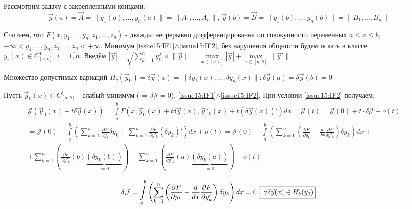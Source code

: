     Рассмотрим задачу с закрепленными концами: 
    \begin{equation} \label{issue15:IF2}
        \vec{y}(a) = \vec{A} = \| y_1(a), ..., y_n(a)\| = \| A_1, ..., A_n\|,\, \vec{y}(b) = \vec{B} = \| y_1(b), ..., y_n(b)\| = \| B_1, ..., B_n \|
    \end{equation}
    
    Считаем, что $F(x, y_1, ..., y_n, z_1, ..., z_n)$ - дважды непрерывно дифференцированна по совокупности переменных $a \leq x \leq b$, $-\infty < y_1, ..., y_n, z_1, ..., z_n < +\infty$. 
    Минимум \eqref{issue15:IF1}$\wedge$\eqref{issue15:IF2}, без нарушения общности будем искать в классе $y_i(x) \in C^1_{[a;b]}, \, i = \overline{1, n}$. 
    Введём $|\vec{y}| = \sqrt{\sum \limits_{k=1}^{n} y^2_k}$ и $\|\vec{y}\| = \max \limits_{x \in [a;b]} |\vec{y}| + \max \limits_{x \in [a;b]} \| \vec{y}' \|$ 

    Множество допустимых вариаций $H_{\delta}(\vec{y}_0) = {\delta \vec{y}(x) = \| \delta y_1 (x), ..., \delta y_n(x)\|: \delta \vec{y}(a) = \delta \vec{y}(b) = 0}$

    Пусть $\vec{y}_0(x) \in C^1_{[a;b]}$ - слабый минимум ($\Rightarrow \delta \mathcal{J} = 0$), \eqref{issue15:IF1}$\wedge$\eqref{issue15:IF2}. При условии \eqref{issue15:IF2} получаем:
    \begin{multline*}
            \mathcal{J}(\vec{y}_0(x) + t \delta \vec{y}(x)) = \int \limits_a^b F(x, \vec{y}_0(x) + t\delta \vec{y}(x), \vec{y}\,'_0(x) + t(\delta \vec{y}(x))')dx = \mathcal{J}(t) = \mathcal{J}(0) + t \cdot \delta\mathcal{J} + o(t) = \\
            = \mathcal{J}(0) + \int \limits_a^b \left( \sum \limits_{k =1}^n \frac{\partial F}{\partial y_k} \delta y_k + \sum \limits_{k=1}^n \frac{\partial F}{\partial y'_k} (\delta y_k)' \right) dx + o(t) = \mathcal{J}(0) + \int \limits_a^b \left( \sum \limits_{k = 1}^n \left( \frac{\partial F}{\partial y_k} - \frac{d}{dx} \frac{\partial F}{\delta y'_k}  \right) \delta y_k \right) dx + \\
            + \sum \limits_{k = 1}^n \left( \frac{\partial F}{\partial y'_k}(b) \underbrace{(\delta y_k (b))}_{= 0} \right) - \sum \limits_{k = 1}^n \left( \frac{\partial F}{\partial y'_k}(a) \underbrace{(\delta y_k (a))}_{= 0} \right) + o(t) 
    \end{multline*}

    \[ \delta \mathcal{J} = \int \limits_a^b \left(\sum \limits_{k = 1}^n \left( \frac{\partial F}{\partial y_k} - 
    \frac{d}{dx} \frac{\partial F}{\partial y'_k} \right) \delta y_k \right) dx = 0 \,\, 
    \text{\fbox{  $\forall \delta \vec{y}(x) \in H_{\delta}(\vec{y}_0) $}}
    \]

